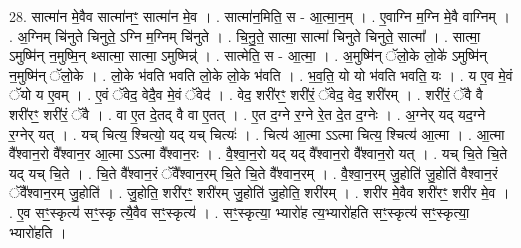 \documentclass[17pt]{extarticle}
\begin{document}
28. सात्मा॑न मे॒वैव सात्मा॑नꣳ॒॒ सात्मा॑न मे॒व । . सात्मा॑न॒मिति॒ स - आ॒त्मा॒न॒म् । . ए॒वाग्नि म॒ग्नि मे॒वै वाग्निम् । . अ॒ग्निम् चि॑नुते चिनुते॒ ऽग्नि म॒ग्निम् चि॑नुते । . चि॒नु॒ते॒ सात्मा॒ सात्मा॑ चिनुते चिनुते॒ सात्मा᳚ । . सात्मा॒ ऽमुष्मि॑न् न॒मुष्मि॒न् थ्सात्मा॒ सात्मा॒ ऽमुष्मिन्न्॑ । . सात्मेति॒ स - आ॒त्मा॒ । . अ॒मुष्मि॑न् ॅलो॒के लो॒के॑ ऽमुष्मि॑न् न॒मुष्मि॑न् ॅलो॒के । . लो॒के भ॑वति भवति लो॒के लो॒के भ॑वति । . भ॒व॒ति॒ यो यो भ॑वति भवति॒ यः । . य ए॒व मे॒वं ॅयो य ए॒वम् । . ए॒वं ॅवेद॒ वेदै॒व मे॒वं ॅवेद॑ । . वेद॒ शरी॑रꣳ॒॒ शरी॑रं॒ ॅवेद॒ वेद॒ शरी॑रम् । . शरी॑रं॒ ॅवै वै शरी॑रꣳ॒॒ शरी॑रं॒ ॅवै । . वा ए॒त दे॒तद् वै वा ए॒तत् । . ए॒त द॒ग्ने र॒ग्ने रे॒त दे॒त द॒ग्नेः । . अ॒ग्नेर् यद् यद॒ग्ने र॒ग्नेर् यत् । . यच् चित्य॒ श्चित्यो॒ यद् यच् चित्यः॑ । . चित्य॑ आ॒त्मा ऽऽत्मा चित्य॒ श्चित्य॑ आ॒त्मा । . आ॒त्मा वै᳚श्वान॒रो वै᳚श्वान॒र आ॒त्मा ऽऽत्मा वै᳚श्वान॒रः । . वै॒श्वा॒न॒रो यद् यद् वै᳚श्वान॒रो वै᳚श्वान॒रो यत् । . यच् चि॒ते चि॒ते यद् यच् चि॒ते । . चि॒ते वै᳚श्वान॒रं ॅवै᳚श्वान॒रम् चि॒ते चि॒ते वै᳚श्वान॒रम् । . वै॒श्वा॒न॒रम् जु॒होति॑ जु॒होति॑ वैश्वान॒रं ॅवै᳚श्वान॒रम् जु॒होति॑ । . जु॒होति॒ शरी॑रꣳ॒॒ शरी॑रम् जु॒होति॑ जु॒होति॒ शरी॑रम् । . शरी॑र मे॒वैव शरी॑रꣳ॒॒ शरी॑र मे॒व । . ए॒व सꣳ॒॒स्कृत्य॑ सꣳ॒॒स्कृ त्यै॒वैव सꣳ॒॒स्कृत्य॑ । . सꣳ॒॒स्कृत्या॒ भ्यारो॑ह त्य॒भ्यारो॑हति सꣳ॒॒स्कृत्य॑ सꣳ॒॒स्कृत्या॒ भ्यारो॑हति । \newline
\end{document}
